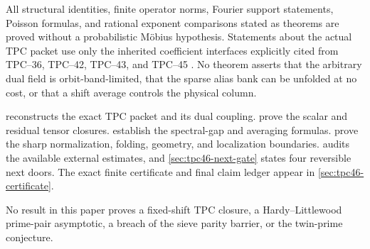 All structural identities, finite operator norms, Fourier support
statements, Poisson formulas, and rational exponent comparisons stated
as theorems are proved without a probabilistic M\"obius hypothesis.
Statements about the actual TPC packet use only the inherited
coefficient interfaces explicitly cited from TPC--36, TPC--42,
TPC--43, and TPC--45 \citep{WangTPC36,WangTPC42,WangTPC43,WangTPC45}.
No theorem asserts that the arbitrary dual field is orbit-band-limited,
that the sparse alias bank can be unfolded at no cost, or that a shift
average controls the physical column.

 reconstructs the exact TPC packet and its
dual coupling.  
prove the scalar and residual tensor closures.
 establish the
spectral-gap and averaging formulas.
 prove
the sharp normalization, folding, geometry, and localization
boundaries.   audits the available
external estimates, and \cref{sec:tpc46-next-gate} states four
reversible next doors.  The exact finite certificate and final claim
ledger appear in \cref{sec:tpc46-certificate}.

No result in this paper proves a fixed-shift TPC closure, a
Hardy--Littlewood prime-pair asymptotic, a breach of the sieve parity
barrier, or the twin-prime conjecture.
